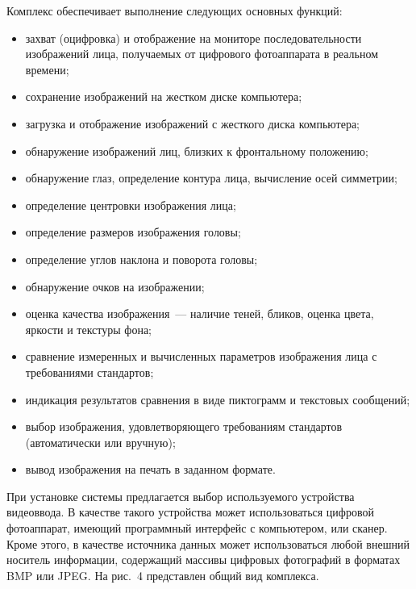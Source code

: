 \begin{multicols}{2}
Комплекс обеспечивает выполнение сле\-ду\-ющих основных функций:
\begin{itemize}
\item захват (оцифровка) и отображение на мониторе последовательности изображений лица, получаемых от цифрового 
фотоаппарата в реальном времени;
\item сохранение изображений на жестком диске компьютера;
\item загрузка и отображение изображений с жесткого диска компьютера;
\item обнаружение изображений лиц, близких к фронтальному положению;
\item обнаружение глаз, определение контура лица, вычисление осей симметрии;
\item определение центровки изображения лица;
\item определение размеров изображения головы;
\item определение углов наклона и поворота головы;
\item обнаружение очков на изображении;
\item оценка качества изображения~--- наличие теней, бликов, оценка цвета, яркости и текстуры фона;
\item сравнение измеренных и вычисленных па\-ра\-мет\-ров изображения лица с требованиями стандартов;
\item индикация результатов сравнения в виде пиктограмм и текстовых сообщений;
\item выбор изображения, удовлетворяющего требованиям стандартов (автоматически или вручную);
\item вывод изображения на печать в заданном формате.
\end{itemize}


При установке системы предлагается выбор используемого устройства видеоввода. В качестве такого устройства может 
использоваться цифровой фотоаппарат, имеющий программный интерфейс с компьютером, или сканер. Кроме этого, в качестве 
источника данных может использоваться любой внешний носитель информации, содержащий массивы цифровых фотографий в 
форматах BMP или JPEG. На рис.~4 представлен общий вид комплекса.



\end{multicols}
